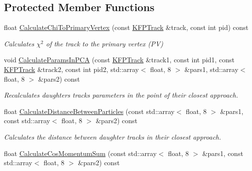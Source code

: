 \subsection*{Protected Member Functions}
\begin{DoxyCompactItemize}
\item 
float \hyperlink{classSimpleFinder_aba9d34b1412abc495838a6c5c99b997b}{Calculate\+Chi\+To\+Primary\+Vertex} (const \hyperlink{classKFPTrack}{K\+F\+P\+Track} \&track, const int pid) const \hypertarget{classSimpleFinder_aba9d34b1412abc495838a6c5c99b997b}{}\label{classSimpleFinder_aba9d34b1412abc495838a6c5c99b997b}

\begin{DoxyCompactList}\small\item\em Calculates $\chi^2$ of the track to the primary vertex (PV) \end{DoxyCompactList}\item 
void \hyperlink{classSimpleFinder_a6f67c15111fa7a4c19144acef48f7877}{Calculate\+Params\+In\+P\+CA} (const \hyperlink{classKFPTrack}{K\+F\+P\+Track} \&track1, const int pid1, const \hyperlink{classKFPTrack}{K\+F\+P\+Track} \&track2, const int pid2, std\+::array$<$ float, 8 $>$ \&pars1, std\+::array$<$ float, 8 $>$ \&pars2) const \hypertarget{classSimpleFinder_a6f67c15111fa7a4c19144acef48f7877}{}\label{classSimpleFinder_a6f67c15111fa7a4c19144acef48f7877}

\begin{DoxyCompactList}\small\item\em Recalculates daughters tracks\textquotesingle{} parameters in the point of their closest approach. \end{DoxyCompactList}\item 
float \hyperlink{classSimpleFinder_ab2ae6ae5184a0343e9256bf2a57fa3f4}{Calculate\+Distance\+Between\+Particles} (const std\+::array$<$ float, 8 $>$ \&pars1, const std\+::array$<$ float, 8 $>$ \&pars2) const \hypertarget{classSimpleFinder_ab2ae6ae5184a0343e9256bf2a57fa3f4}{}\label{classSimpleFinder_ab2ae6ae5184a0343e9256bf2a57fa3f4}

\begin{DoxyCompactList}\small\item\em Calculates the distance between daughter tracks in their closest approach. \end{DoxyCompactList}\item 
float \hyperlink{classSimpleFinder_adf804cbf61f06440529c38f703182030}{Calculate\+Cos\+Momentum\+Sum} (const std\+::array$<$ float, 8 $>$ \&pars1, const std\+::array$<$ float, 8 $>$ \&pars2) const \hypertarget{classSimpleFinder_adf804cbf61f06440529c38f703182030}{}\label{classSimpleFinder_adf804cbf61f06440529c38f703182030}


\end{DoxyCompactItemize}
